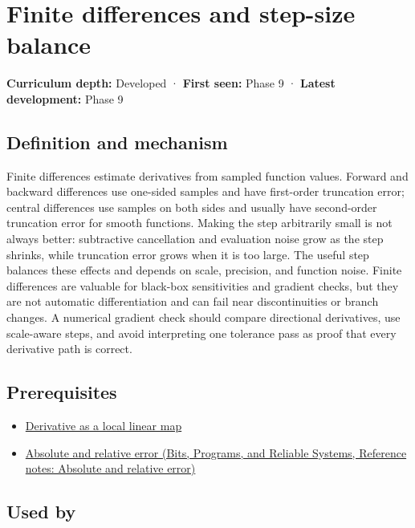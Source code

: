 \hypertarget{appendix-e2d7b4f2161d}{}\label{referencestart:appendix-e2d7b4f2161d}
\section{Finite differences and step-size balance}\label{appendix-e2d7b4f2161d-finite-differences-and-step-size-balance}

\textbf{Curriculum depth:} Developed · \textbf{First seen:} Phase 9 · \textbf{Latest development:} Phase 9

\subsection{Definition and mechanism}\label{appendix-e2d7b4f2161d-definition-and-mechanism}

Finite differences estimate derivatives from sampled function values. Forward and backward differences use one-sided samples and have first-order truncation error; central differences use samples on both sides and usually have second-order truncation error for smooth functions. Making the step arbitrarily small is not always better: subtractive cancellation and evaluation noise grow as the step shrinks, while truncation error grows when it is too large. The useful step balances these effects and depends on scale, precision, and function noise. Finite differences are valuable for black-box sensitivities and gradient checks, but they are not automatic differentiation and can fail near discontinuities or branch changes. A numerical gradient check should compare directional derivatives, use scale-aware steps, and avoid interpreting one tolerance pass as proof that every derivative path is correct.

\subsection{Prerequisites}\label{appendix-e2d7b4f2161d-prerequisites}

\begin{itemize}
\tightlist
\item
  \hyperref[appendix-7bc181935c42]{Derivative as a local linear map}
\item
  \href{../01-Bits-Programs-and-Reliable-Systems/main.pdf\#nameddest=appendix-3ae74e89b4e6}{Absolute and relative error (Bits, Programs, and Reliable Systems, Reference notes: Absolute and relative error)}
\end{itemize}

\subsection{Used by}\label{appendix-e2d7b4f2161d-used-by}


